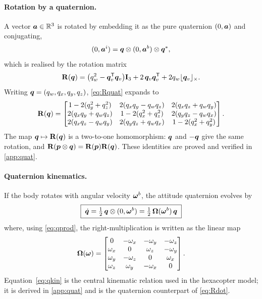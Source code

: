\paragraph{Rotation by a quaternion.} A vector $\bm{a}\in\mathbb{R}^3$ is rotated by
embedding it as the pure quaternion $(0,\bm{a})$ and conjugating,
\begin{equation}
(0,\bm{a}^{i}) = \bm{q}\otimes(0,\bm{a}^{b})\otimes\bm{q}^{\ast},
\end{equation}
which is realised by the rotation matrix
\begin{equation}
\mathbf{R}(\bm{q})
=\bigl(q_w^2-\bm{q}_v^{\mathsf{T}}\bm{q}_v\bigr)\mathbf{I}_3
+2\,\bm{q}_v\bm{q}_v^{\mathsf{T}}+2q_w\lfloor \bm{q}_v \rfloor_{\times}.
\label{eq:Rquat}
\end{equation}
Writing $\bm{q}=(q_w,q_x,q_y,q_z)$, \cref{eq:Rquat} expands to
\begin{equation}
\mathbf{R}(\bm{q})=
\begin{bmatrix}
1-2(q_y^2+q_z^2) & 2(q_xq_y-q_wq_z) & 2(q_xq_z+q_wq_y)\\
2(q_xq_y+q_wq_z) & 1-2(q_x^2+q_z^2) & 2(q_yq_z-q_wq_x)\\
2(q_xq_z-q_wq_y) & 2(q_yq_z+q_wq_x) & 1-2(q_x^2+q_y^2)
\end{bmatrix}.
\label{eq:Rquat-expanded}
\end{equation}
The map $\bm{q}\mapsto\mathbf{R}(\bm{q})$ is a two-to-one homomorphism:
$\bm{q}$ and $-\bm{q}$ give the same rotation, and
$\mathbf{R}(\bm{p}\otimes\bm{q})=\mathbf{R}(\bm{p})\mathbf{R}(\bm{q})$. These
identities are proved and verified in \cref{app:quat}.

\paragraph{Quaternion kinematics.} If the body rotates with angular velocity
$\bm{\omega}^{b}$, the attitude quaternion evolves by
\begin{equation}
\boxed{\;\dot{\bm{q}}=\tfrac12\,\bm{q}\otimes(0,\bm{\omega}^{b})
=\tfrac12\,\bm{\Omega}(\bm{\omega}^{b})\,\bm{q}\;}
\label{eq:qkin}
\end{equation}
where, using \cref{eq:qprod}, the right-multiplication is written as the linear
map
\begin{equation}
\bm{\Omega}(\bm{\omega})=
\begin{bmatrix}
0 & -\omega_x & -\omega_y & -\omega_z\\
\omega_x & 0 & \omega_z & -\omega_y\\
\omega_y & -\omega_z & 0 & \omega_x\\
\omega_z & \omega_y & -\omega_x & 0
\end{bmatrix}.
\label{eq:Omega}
\end{equation}
Equation~\eqref{eq:qkin} is the central kinematic relation used in the
hexacopter model; it is derived in \cref{app:quat} and is the quaternion
counterpart of \cref{eq:Rdot}.

